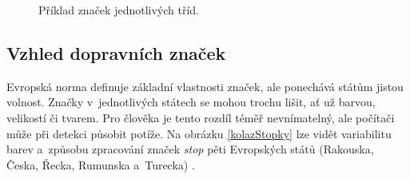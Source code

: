 \begin{figure}[H]
    \centering
    \caption{Příklad značek jednotlivých tříd.\footnotemark}
    \label{kolazDopravniZnacky}
\end{figure}


\subsection*{Vzhled dopravních značek}
\label{dopravniZnaceniBarvy}
Evropská norma definuje základní vlastnosti značek, ale ponechává státům jistou volnost. Značky v~jednotlivých státech se mohou trochu lišit, ať už barvou, velikostí či tvarem. Pro člověka je tento rozdíl téměř nevnímatelný, ale počítači může při detekci působit potíže. Na obrázku \ref{kolazStopky} lze vidět variabilitu barev a~způsobu zpracování značek \emph{stop} pěti Evropských států (Rakouska, Česka, Řecka, Rumunska a~Turecka) \cite{dopravniZnacka}.

